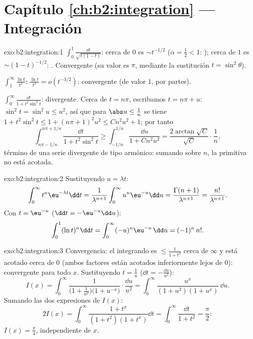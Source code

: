 \section*{Capítulo \ref{ch:b2:integration} --- Integración}

\begin{solution}{exo:b2:integration:1}
$\int_0^1 \frac{\dd t}{\sqrt{t(1-t)}}$: cerca de $0$ es $\sim
t^{-1/2}$ ($\alpha = \frac12 < 1$: ); cerca de $1$ es $\sim
(1-t)^{-1/2}$: . Convergente (su valor es $\pi$, mediante la
sustitución $t = \sin^2\theta$).

$\int_1^\infty \frac{\ln t}{t^2}$: $\frac{\ln t}{t^2} =
o(t^{-3/2})$: convergente (de valor $1$, por partes).

$\int_0^\infty \frac{\dd t}{1 + t^2\sin^2 t}$: divergente. Cerca de
$t = n\pi$, escribamos $t = n\pi + u$: $\sin^2 t = \sin^2 u \leq
u^2$, así que para $\abs u \leq \frac{1}{n}$ se tiene $1 + t^2\sin^2
t \leq 1 + (n\pi + 1)^2u^2 \leq C n^2 u^2 + 1$; por tanto
\[
\int_{n\pi - 1/n}^{n\pi + 1/n} \frac{\dd t}{1 + t^2\sin^2 t}
\geq \int_{-1/n}^{1/n} \frac{\dd u}{1 + Cn^2u^2}
= \frac{2\arctan\sqrt C}{\sqrt C}\cdot\frac{1}{n} ,
\]
término de una serie divergente de tipo armónico: sumando sobre $n$,
la primitiva no está acotada.
\end{solution}

\begin{solution}{exo:b2:integration:2}
Sustituyendo $u = \lambda t$:
\[
\int_0^\infty t^n \eu^{-\lambda t}\dd t
= \frac{1}{\lambda^{n+1}}\int_0^\infty u^n\eu^{-u}\dd u
= \frac{\Gamma(n+1)}{\lambda^{n+1}} = \frac{n!}{\lambda^{n+1}} .
\]
Con $t = \eu^{-u}$ ($\dd t = -\eu^{-u}\dd u$):
\[
\int_0^1 (\ln t)^n \dd t = \int_0^{\infty} (-u)^n \eu^{-u}\,\dd u
= (-1)^n\, n! .
\]
\end{solution}

\begin{solution}{exo:b2:integration:3}
Convergencia: el integrando es $\leq \frac{1}{1+t^2}$ cerca de
$\infty$ y está acotado cerca de $0$ (ambos factores están acotados
inferiormente lejos de $0$):  convergente para todo
$x$. Sustituyendo $t = \frac1u$ ($\dd t = -\frac{\dd u}{u^2}$):
\[
I(x) = \int_0^\infty \frac{1}{\bigl(1 +
\frac1{u^2}\bigr)\bigl(1 + u^{-x}\bigr)}\cdot\frac{\dd u}{u^2}
= \int_0^\infty \frac{u^x}{(1 + u^2)(1 + u^x)}\,\dd u .
\]
Sumando las dos expresiones de $I(x)$:
\[
2I(x) = \int_0^\infty \frac{1 + t^x}{(1+t^2)(1+t^x)}\dd t
= \int_0^\infty \frac{\dd t}{1 + t^2} = \frac{\pi}{2} :
\]
$I(x) = \frac\pi4$, independiente de $x$.
\end{solution}

